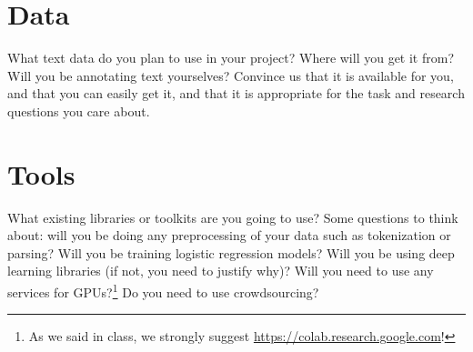 \documentclass[11pt,a4paper]{article}
\begin{document}
\section{Data}

What text data do you plan to use in your project? Where will you get it from? Will you be annotating text yourselves? Convince us that it is available for you, and that you can easily get it, and that it is appropriate for the task and research questions you care about.


\section{Tools}
What existing libraries or toolkits are you going to use? Some questions to think about: will you be doing any preprocessing of your data such as tokenization or parsing? Will you be training logistic regression models? Will you be using deep learning libraries (if not, you need to justify why)? Will you need to use any services for GPUs?\footnote{As we said in class, we strongly suggest \url{https://colab.research.google.com}!} Do you need to use crowdsourcing?


\footnotesize

\end{document}
